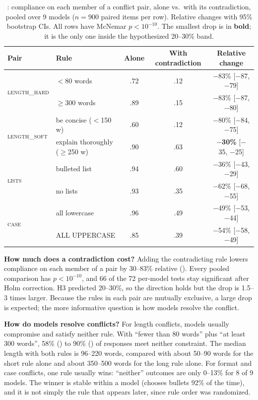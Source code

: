 \begin{table}[t]
    \centering
    \caption{\expD: compliance on each member of a conflict pair, alone vs.\ with its contradiction, pooled over 9 models ($n{=}900$ paired items per row). Relative changes with 95\% bootstrap CIs. All rows have McNemar $p<10^{-10}$. The smallest drop is in \textbf{bold}; it is the only one inside the hypothesized 20--30\% band.}
    \label{tab:conflict}
    \small
    \begin{tabular}{@{}llccc@{}}
        \toprule
        \textbf{Pair} & \textbf{Rule} & \textbf{Alone} & \textbf{With contradiction} & \textbf{Relative change} \\
        \midrule
        \multirow{2}{*}{\textsc{length\_hard}} & $<$80 words & .72 & .12 & $-$83\% [$-$87, $-$79] \\
        & $\ge$300 words & .89 & .15 & $-$83\% [$-$87, $-$80] \\
        \midrule
        \multirow{2}{*}{\textsc{length\_soft}} & be concise ($<$150 w) & .60 & .12 & $-$80\% [$-$84, $-$75] \\
        & explain thoroughly ($\ge$250 w) & .90 & .63 & \textbf{$-$30\%} [$-$35, $-$25] \\
        \midrule
        \multirow{2}{*}{\textsc{lists}} & bulleted list & .94 & .60 & $-$36\% [$-$43, $-$29] \\
        & no lists & .93 & .35 & $-$62\% [$-$68, $-$55] \\
        \midrule
        \multirow{2}{*}{\textsc{case}} & all lowercase & .96 & .49 & $-$49\% [$-$53, $-$44] \\
        & ALL UPPERCASE & .85 & .39 & $-$54\% [$-$58, $-$49] \\
        \bottomrule
    \end{tabular}
\end{table}

{\bf How much does a contradiction cost?}
Adding the contradicting rule lowers compliance on each member of a pair by 30--83\% relative ().
Every pooled comparison has $p < 10^{-10}$, and 66 of the 72 per-model tests stay significant after Holm correction.
H3 predicted 20--30\%, so the direction holds but the drop is 1.5--3 times larger.
Because the rules in each pair are mutually exclusive, a large drop is expected; the more informative question is how models resolve the conflict.

{\bf How do models resolve conflicts?}
For length conflicts, models usually compromise and satisfy neither rule.
With ``fewer than 80 words'' plus ``at least 300 words'', 58\% (\qthree) to 90\% (\lone) of responses meet neither constraint.
The median length with both rules is 96--220 words, compared with about 50--90 words for the short rule alone and about 350--500 words for the long rule alone.
For format and case conflicts, one rule usually wins: ``neither'' outcomes are only 0--13\% for 8 of 9 models.
The winner is stable within a model (\eg \leight chooses bullets 92\% of the time), and it is not simply the rule that appears later, since rule order was randomized.

